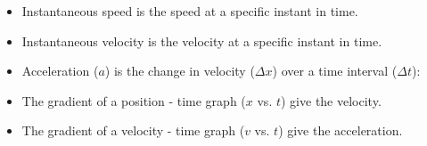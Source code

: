 \begin{itemize}[noitemsep]
    \label{m38796*uid163}\item Instantaneous speed is the speed at a specific instant in time.
\label{m38796*uid164}\item Instantaneous velocity is the velocity at a specific instant in time.
\label{m38796*uid165}\item Acceleration (\begin{math}a\end{math}) is the change in velocity (\begin{math}\Delta x\end{math}) over a time interval (\begin{math}\Delta t\end{math}):
\label{m38796*id80925}\nopagebreak\noindent{}
    \label{m38796*uid166}\item The gradient of a position - time graph (\begin{math}x\end{math} vs. \begin{math}t\end{math}) give the velocity.
\label{m38796*uid167}\item The gradient of a velocity - time graph (\begin{math}v\end{math} vs. \begin{math}t\end{math}) give the acceleration.

\end{itemize}
